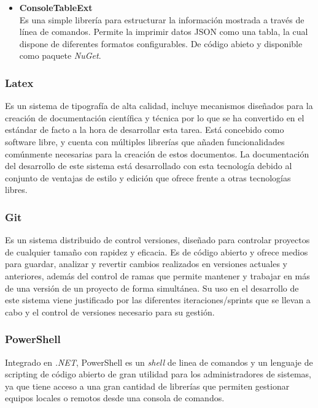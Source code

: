 \begin{itemize}
                \item \textbf{ConsoleTableExt} \\
                    Es una simple librería para estructurar la información mostrada a través de línea de comandos. Permite la imprimir datos JSON como una tabla, la cual dispone de diferentes formatos configurables. De código abieto y disponible como paquete \textit{NuGet}. \cite{consoletableext}
            \end{itemize}
            
        \subsubsection{Latex}
            Es un sistema de tipografía de alta calidad, incluye mecanismos diseñados para la creación de documentación científica y técnica por lo que se ha convertido en el estándar de facto a la hora de desarrollar esta tarea. Está concebido como software libre, y cuenta con múltiples librerías que añaden funcionalidades comúnmente necesarias para la creación de estos documentos. La documentación del desarrollo de este sistema está desarrollado con esta tecnología debido al conjunto de ventajas de estilo y edición que ofrece frente a otras tecnologías libres.

        \subsubsection{Git}
            Es un sistema distribuido de control versiones, diseñado para controlar proyectos de cualquier tamaño con rapidez y eficacia. Es de código abierto y ofrece medios para guardar, analizar y revertir cambios realizados en versiones actuales y anteriores, además del control de ramas que permite mantener y trabajar en más de una versión de un proyecto de forma simultánea. Su uso en el desarrollo de este sistema viene justificado por las diferentes iteraciones/sprints que se llevan a cabo y el control de versiones necesario para su gestión.
            
        \subsubsection{PowerShell}
            Integrado en \textit{.NET}, PowerShell es un \textit{shell} de linea de comandos y un lenguaje de scripting de código abierto de gran utilidad para los administradores de sistemas, ya que tiene acceso a una gran cantidad de librerías que permiten gestionar equipos locales o remotos desde una consola de comandos. \cite{powershell}
        
